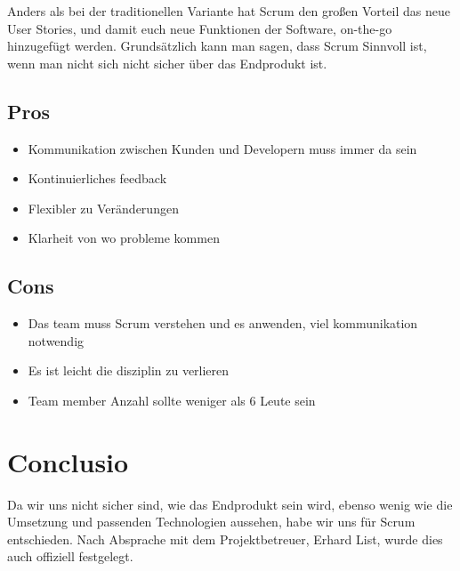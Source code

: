 Anders als bei der traditionellen Variante hat Scrum den großen Vorteil das neue User Stories, und damit euch neue Funktionen der Software, on-the-go hinzugefügt werden. Grundsätzlich kann man sagen, dass Scrum Sinnvoll ist, wenn man nicht sich nicht sicher über das Endprodukt ist.

\subsection{Pros}
\begin{itemize}
		\item Kommunikation zwischen Kunden und Developern muss immer da sein
		\item Kontinuierliches feedback
		\item Flexibler zu Veränderungen
		\item Klarheit von wo probleme kommen
\end{itemize}

\subsection{Cons}
\begin{itemize}
		\item Das team muss Scrum verstehen und es anwenden, viel kommunikation notwendig
		\item Es ist leicht die disziplin zu verlieren
		\item Team member Anzahl sollte weniger als 6 Leute sein
\end{itemize}



\section{Conclusio}
Da wir uns nicht sicher sind, wie das Endprodukt sein wird, ebenso wenig wie die Umsetzung und passenden Technologien aussehen, habe wir uns für Scrum entschieden. Nach Absprache mit dem Projektbetreuer, Erhard List, wurde dies auch offiziell festgelegt.
